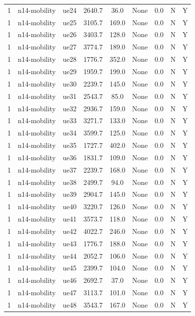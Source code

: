 \begin{table}[ht]
\begin{tabular}{|c|c|c|c|c|c|c|c|c|}
1 & n14-mobility & ue24 & 2640.7 & 36.0 & None & 0.0 & N & Y \\
1 & n14-mobility & ue25 & 3105.7 & 169.0 & None & 0.0 & N & Y \\
1 & n14-mobility & ue26 & 3403.7 & 128.0 & None & 0.0 & N & Y \\
1 & n14-mobility & ue27 & 3774.7 & 189.0 & None & 0.0 & N & Y \\
1 & n14-mobility & ue28 & 1776.7 & 352.0 & None & 0.0 & N & Y \\
1 & n14-mobility & ue29 & 1959.7 & 199.0 & None & 0.0 & N & Y \\
1 & n14-mobility & ue30 & 2239.7 & 145.0 & None & 0.0 & N & Y \\
1 & n14-mobility & ue31 & 2543.7 & 85.0 & None & 0.0 & N & Y \\
1 & n14-mobility & ue32 & 2936.7 & 159.0 & None & 0.0 & N & Y \\
1 & n14-mobility & ue33 & 3271.7 & 133.0 & None & 0.0 & N & Y \\
1 & n14-mobility & ue34 & 3599.7 & 125.0 & None & 0.0 & N & Y \\
1 & n14-mobility & ue35 & 1727.7 & 402.0 & None & 0.0 & N & Y \\
1 & n14-mobility & ue36 & 1831.7 & 109.0 & None & 0.0 & N & Y \\
1 & n14-mobility & ue37 & 2239.7 & 168.0 & None & 0.0 & N & Y \\
1 & n14-mobility & ue38 & 2499.7 & 94.0 & None & 0.0 & N & Y \\
1 & n14-mobility & ue39 & 2904.7 & 145.0 & None & 0.0 & N & Y \\
1 & n14-mobility & ue40 & 3220.7 & 126.0 & None & 0.0 & N & Y \\
1 & n14-mobility & ue41 & 3573.7 & 118.0 & None & 0.0 & N & Y \\
1 & n14-mobility & ue42 & 4022.7 & 246.0 & None & 0.0 & N & Y \\
1 & n14-mobility & ue43 & 1776.7 & 188.0 & None & 0.0 & N & Y \\
1 & n14-mobility & ue44 & 2052.7 & 106.0 & None & 0.0 & N & Y \\
1 & n14-mobility & ue45 & 2399.7 & 104.0 & None & 0.0 & N & Y \\
1 & n14-mobility & ue46 & 2692.7 & 37.0 & None & 0.0 & N & Y \\
1 & n14-mobility & ue47 & 3113.7 & 101.0 & None & 0.0 & N & Y \\
1 & n14-mobility & ue48 & 3543.7 & 167.0 & None & 0.0 & N & Y \\

\end{tabular}
\end{table}
